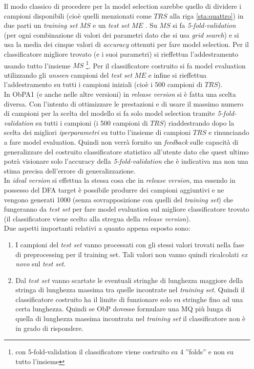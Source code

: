  
 Il modo classico di procedere  per la model selection sarebbe quello di dividere i campioni disponibili (cioè quelli menzionati come $TRS$ alla riga \ref{sta:quattro}) in due parti un \textit{training set} $MS$ e un \textit{test set} $ME$ . Su $MS$ si fa \textit{5-fold-validation} (per ogni combinazione di valori dei parametri dato che si usa \textit{grid search}) e si usa la media dei cinque valori di \textit{accuracy} ottenuti per fare model selection. Per il classificatore migliore trovato (e i suoi parametri) si rieffettua l'addestramento usando tutto l'insieme $MS$ \footnote{con 5-fold-validation il classificatore viene costruito su 4 ''folds'' e non su tutto l'insieme}. Per il classificatore costruito si fa model evaluation utilizzando gli \textit{unseen} campioni del \textit{test set} $ME$  e infine si rieffettua l'addestramento su tutti i campioni  iniziali (cioè i 500 campioni di $TRS$). \\
In \ac{ObPA}1 (e anche nelle altre versioni) in \textit{release version} si è fatta una scelta diversa. Con l'intento di ottimizzare le prestazioni e di usare il massimo numero di campioni per la scelta del modello si fa solo model selection tramite \textit{5-fold-validation} su tutti i campioni (i 500 campioni di $TRS$) riaddestrando dopo la scelta dei migliori \textit{iperparametri} su tutto l'insieme di campioni $TRS$ e rinunciando a fare model evaluation. Quindi non verrà fornito un \textit{feedback}  sulle capacità di generalizzare del costruito classificatore statistico all'utente dato che quest ultimo potrà visionare solo l'accuracy della \textit{5-fold-validation} che è indicativa ma non una stima precisa dell'errore di generalizzazione.\\
In \textit{ideal version} si effettua la stessa cosa che in \textit{release version}, ma essendo in possesso del \ac{DFA} target è possibile  produrre dei campioni aggiuntivi e ne vengono generati 1000  (senza sovrapposizione con quelli del \textit{training set}) che fungeranno da \textit{test set} per fare model evaluation sul migliore classificatore trovato (il classificatore viene scelto alla stregua della \textit{release version}).\\
Due aspetti importanti relativi a quanto appena esposto sono:
\begin{enumerate}
\item I campioni del \textit{test set} vanno processati con gli stessi valori trovati nella fase di preprocessing per il training set. Tali valori non vanno quindi ricalcolati \textit{ex novo} sul \textit{test set}.
\item Dal \textit{test set} vanno scartate le eventuali stringhe di lunghezza maggiore della stringa di lunghezza massima tra quelle incontrate nel \textit{training set}. Quindi il classificatore costruito ha il limite di funzionare solo su stringhe fino ad una certa lunghezza. Quindi se \ac{ObP} dovesse formulare una \ac{MQ} più lunga di quella di lunghezza massima incontrata nel \textit{training set} il classificatore non è in grado di rispondere. 
\end {enumerate}

